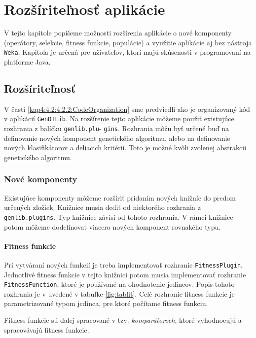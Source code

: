 \chapter{Rozšíriteľnosť aplikácie}\label{kapIII}
V tejto kapitole popíšeme možnosti rozšírenia aplikácie o nové komponenty (operátory, selekcie, fitness funkcie, populácie) a využitie aplikácie aj bez nástroja \verb|Weka|. Kapitola je určená pre užívateľov, ktorí majú skúsenosti v programovaní na platforme Java.

\section{Rozšíriteľnosť}\label{kap4:4.4:Plugin}
V časti \ref{kap4:4.2:4.2.2:CodeOrganization} sme predviedli ako je organizovaný kód v aplikácií \verb|GenDTLib|.
Na rozšírenie tejto aplikácie môžeme použiť existujúce rozhrania z balíčku \verb|genlib.plu|- \verb|gins|. Rozhrania môžu byť určené buď na definovanie nových komponent genetického algoritmu, alebo na definovanie nových klasifikátorov a deliacich kritérií. Toto je možné kvôli zvolenej abstrakcii genetického algoritmu.
\subsection{Nové komponenty}
Existujúce komponenty môžeme rozšíriť pridaním nových knižníc do predom určených zložiek. Knižnice musia dediť od niektorého rozhrania z \verb|genlib.plugins|. Typ knižnice závisí od tohoto rozhrania. V rámci knižnice potom môžeme  dodefinovať viacero nových komponent rovnakého typu. 

\subsubsection*{Fitness funkcie}
Pri vytváraní nových funkcií je treba implementovať rozhranie \verb|FitnessPlugin|. Jednotlivé fitness funkcie v tejto knižnici potom musia implementovať rozhranie \verb|FitnessFunction|, ktoré je používané na ohodnotenie jedincov.
Popis tohoto rozhrania je v uvedené v tabuľke \ref{fig:tabfit}. Celé rozhranie fitness funkcie je parametrizované typom jedinca, pre ktoré počítame fitness funkciu.

Fitness funkcie sú ďalej spracované v tzv. \emph{komparátoroch}, ktoré vyhodnocujú a spracovávajú fitness funkcie.

